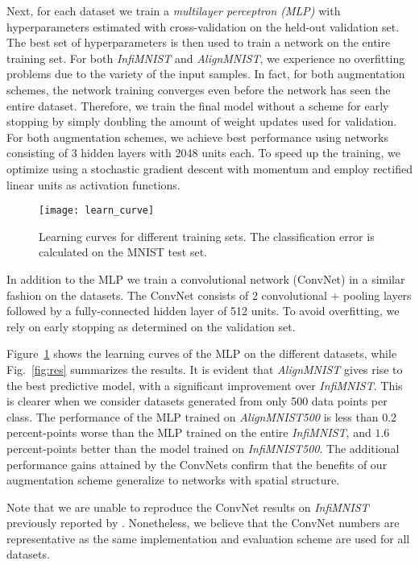 \documentclass[twoside]{article}
\begin{document}
  Next, for each dataset we train a \emph{multilayer perceptron (MLP)} with hyperparameters
  estimated with cross-validation on 
  the held-out validation set.
  The best set of hyperparameters is then used to train a network on the entire training set.
  For both \emph{InfiMNIST} and \emph{AlignMNIST}, we experience no overfitting problems due
  to the variety of the input samples. In fact, for both augmentation schemes,
  the network training converges even before the network has seen the entire
  dataset. Therefore, we train the final model without a scheme for early
  stopping by simply doubling the amount of weight updates used for validation.
  For both augmentation schemes, we achieve best performance using networks
  consisting of 3 hidden layers with 2048 units each.
  To speed up the training, we optimize using a stochastic gradient descent with
  momentum and employ rectified linear units as activation functions.

\begin{figure}
    \centering
    \texttt{[image: learn\_curve]}
    \caption{Learning curves for different training sets. The 
      classification error is calculated on the MNIST test set.}
    \label{fig:learn_curve}
  \end{figure}

In addition to the MLP we train a convolutional network (ConvNet) in a similar fashion on the datasets.
The ConvNet consists of 2 convolutional + pooling layers followed by a fully-connected hidden layer of 512 units.
To avoid overfitting, we rely on early stopping as determined on the validation set.

  Figure~\ref{fig:learn_curve} shows the learning curves of the MLP on the different
  datasets, while Fig.~\ref{fig:res} summarizes the results.
  It is evident that \emph{AlignMNIST} gives rise to the best predictive model,
  with a significant improvement over \emph{InfiMNIST}. This is clearer
  when we consider datasets generated from only 500 data points per class.
  The performance of the MLP trained on \emph{AlignMNIST500} is less than $0.2$
  percent-points worse than the MLP trained on the entire \emph{InfiMNIST},
  and $1.6$ percent-points better than the model trained on \emph{InfiMNIST500}.
  The additional performance gains attained by the ConvNets confirm that the
  benefits of our augmentation scheme generalize to networks with spatial structure.

  Note that we are unable to reproduce the ConvNet results on \emph{InfiMNIST}
  previously reported by \cite{simard2003best}.
  Nonetheless, we believe that the ConvNet numbers are representative as the same
  implementation and evaluation scheme are used for all datasets.
  
\end{document}
